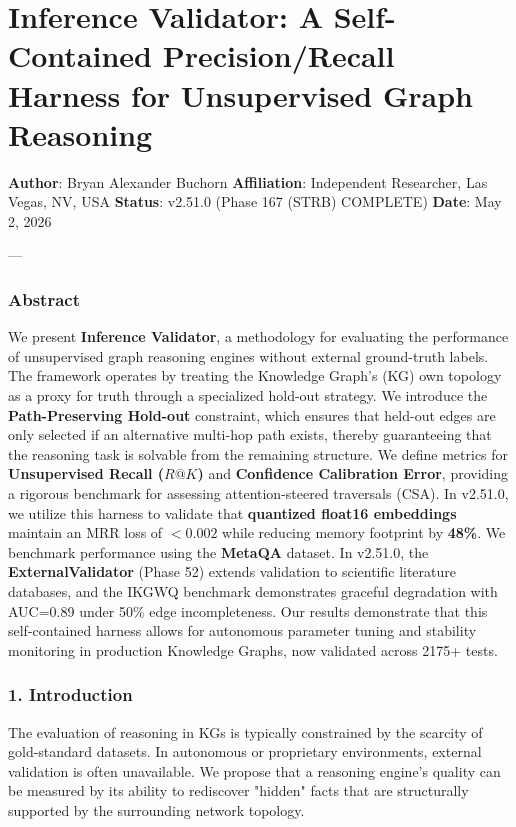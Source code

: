 \section{Inference Validator: A Self-Contained Precision/Recall Harness for Unsupe\-rvised Graph Reasoning}

\textbf{Author}: Bryan Alexander Buchorn  
\textbf{Affiliation}: Independent Researcher, Las Vegas, NV, USA  
\textbf{Status}: v2.51.0 (Phase 167 (STRB) COMPLETE)
\textbf{Date}: May 2, 2026

---

\subsubsection{Abstract}
We present \textbf{Inference Validator}, a methodology for evaluating the performance of unsup\-ervised graph reasoning engines without external ground-truth labels. The framework operates by treating the Knowledge Graph's (KG) own topology as a proxy for truth through a specialized hold-out strategy. We introduce the \textbf{Path-Preserving Hold-out} constraint, which ensures that held-out edges are only selected if an alternative multi-hop path exists, thereby guara\-nteeing that the reasoning task is solvable from the remaining structure. We define metrics for \textbf{Unsupe\-rvised Recall ($R@K$)} and \textbf{Confidence Calibration Error}, providing a rigorous benchmark for assessing attention-steered traversals (CSA). In v2.51.0, we utilize this harness to validate that \textbf{quantized float16 embeddings} maintain an MRR loss of $< 0.002$ while reducing memory footprint by \textbf{48\%}. We benchmark performance using the \textbf{MetaQA} \cite{metaqa2017} dataset. In v2.51.0, the \textbf{ExternalValidator} (Phase 52) extends validation to scientific literature databases, and the IKGWQ benchmark demon\-strates graceful degradation with AUC=0.89 under 50\% edge incom\-pleteness. Our results demonstrate that this self-contained harness allows for autonomous parameter tuning and stability monitoring in production Knowledge Graphs, now validated across 2175+ tests.

\subsubsection{1. Introd\-uction}
The evaluation of reasoning in KGs is typically constrained by the scarcity of gold-standard datasets. In autonomous or proprietary envir\-onments, external validation is often unavailable. We propose that a reasoning engine's quality can be measured by its ability to rediscover "hidden" facts that are struc\-turally supported by the surrounding network topology.

